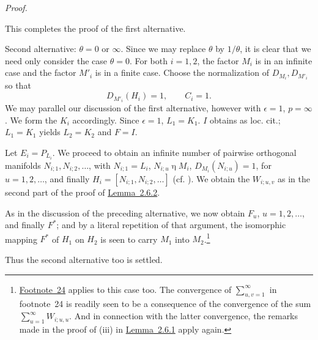 \documentclass[b5paper,twoside]{article}
\newcommand{\lemref}[2]{\hyperref[#1]{\mbox{Lemma~#2}}}
\theoremstyle{mvnplain}
\renewenvironment{proof}[1][Proof]{%
  \par\addvspace{0.35\baselineskip}%
  \noindent\textit{#1.}\ \normalfont\ignorespaces
}{%
  \par\addvspace{0.35\baselineskip}%
}
\newcommand{\M}{\mathbf M}
\newcommand{\Hilbert}{\mathfrak H}
\def\M{M}%
\def\Hilbert{H}%
\def\mathfrak#1{#1}%
\begin{document}
\begin{proof}
This completes the proof of the first alternative.

Second alternative: \(\theta=0\) or \(\infty\). Since we may replace
\(\theta\) by \(1/\theta\), it is clear that we need only consider the case
\(\theta=0\). For both \(i=1,2\), the factor \(\M_i\) is in an infinite
case and the factor \(\M'_i\) is in a finite case. Choose the normalization of
\(D_{\M_i},D_{\M'_i}\) so that
\[
  D_{\M'_i}(\Hilbert_i)=1,\qquad C_i=1.
\]
We may parallel our discussion of the first alternative, however with
\(\epsilon=1\), \(p=\infty\). We form the \(\mathfrak K_i\) accordingly.
Since \(\epsilon=1\), \(\mathfrak L_1=\mathfrak K_1\).
\(\mathfrak I\) obtains as loc. cit.; \(\mathfrak L_1=\mathfrak K_1\) yields
\(\mathfrak L_2=\mathfrak K_2\) and \(\mathfrak F=\mathfrak I\).

Let \(E_i=P_{\mathfrak L_i}\). We proceed to obtain an infinite number of
pairwise orthogonal manifolds
\(\mathfrak N_{i;1},\mathfrak N_{i;2},\ldots\), with
\(\mathfrak N_{i;1}=\mathfrak L_i\),
\(\mathfrak N_{i;u}\mathrel{\eta}\M_i\),
\(D_{\M_i}(\mathfrak N_{i;u})=1\), for \(u=1,2,\ldots\), and finally
\(\Hilbert_i=[\mathfrak N_{i;1},\mathfrak N_{i;2},\ldots]\) (cf.
\cite[p.~155, Lemma~7.1.2]{ref5}). We obtain the \(W_{i;u,v}\) as in the
second part of the proof of \lemref{lem:2.6.2}{2.6.2}.

As in the discussion of the preceding alternative, we now obtain
\(\mathfrak F_u\), \(u=1,2,\ldots\), and finally \(\mathfrak F^*\); and by
a literal repetition of that argument, the isomorphic mapping
\(\mathfrak F^*\) of \(\Hilbert_1\) on \(\Hilbert_2\) is seen to carry
\(\M_1\) into \(\M_2\).\footnote{\hyperlink{fn:24}{Footnote~24} applies to this case too. The
convergence of \(\sum_{u,v=1}^{\infty}\) in footnote~24 is readily seen to
be a consequence of the convergence of the sum
\(\sum_{u=1}^{\infty}W_{i;u,u}\). And in connection with the latter
convergence, the remarks made in the proof of (iii) in
\lemref{lem:2.6.1}{2.6.1} apply again.}

Thus the second alternative too is settled.


\end{proof}
\end{document}
